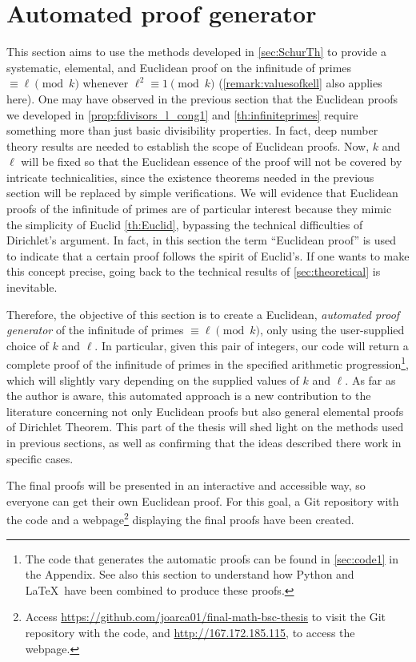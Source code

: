 \documentclass[../main.tex]{subfiles}
\begin{document}
\section{Automated proof generator}\label{sec:practical}

This section aims to use the methods developed in \cref{sec:SchurTh} to provide a systematic, elemental, and Euclidean proof on the infinitude of primes $\equiv \ell \pmod{k}$ whenever $\ell^2\equiv 1\pmod{k}$ (\cref{remark:valuesofkell} also applies here). One may have observed in the previous section that the Euclidean proofs we developed in \cref{prop:fdivisors_l_cong1} and \cref{th:infiniteprimes} require something more than just basic divisibility properties. In fact, deep number theory results are needed to establish the scope of Euclidean proofs. Now, $k$ and $\ell$ will be fixed so that the Euclidean essence of the proof will not be covered by intricate technicalities, since the existence theorems needed in the previous section will be replaced by simple verifications. We will evidence that Euclidean proofs of the infinitude of primes are of particular interest because they mimic the simplicity of Euclid \cref{th:Euclid}, bypassing the technical difficulties of Dirichlet's argument. In fact, in this section the term ``Euclidean proof'' is used to indicate that a certain proof follows the spirit of Euclid's. If one wants to make this concept precise, going back to the technical results of \cref{sec:theoretical} is inevitable.

Therefore, the objective of this section is to create a Euclidean, \emph{automated proof generator} of the infinitude of primes $\equiv \ell\pmod{k}$, only using the user-supplied choice of $k$ and $\ell$. In particular, given this pair of integers, our code will return a complete proof of the infinitude of primes in the specified arithmetic progression\footnote{The code that generates the automatic proofs can be found in \cref{sec:code1} in the Appendix. See also this section to understand how Python and \LaTeX \ have been combined to produce these proofs.}, which will slightly vary depending on the supplied values of $k$ and $\ell$. As far as the author is aware, this automated approach is a new contribution to the literature concerning not only Euclidean proofs but also general elemental proofs of Dirichlet Theorem. This part of the thesis will shed light on the methods used in previous sections, as well as confirming that the ideas described there work in specific cases. 

The final proofs will be presented in an interactive and accessible way, so everyone can get their own Euclidean proof. For this goal, a Git repository with the code and a webpage\footnote{Access \url{https://github.com/joarca01/final-math-bsc-thesis} to visit the Git repository with the code, and \url{http://167.172.185.115}, to access the webpage.} displaying the final proofs have been created.
\end{document}
